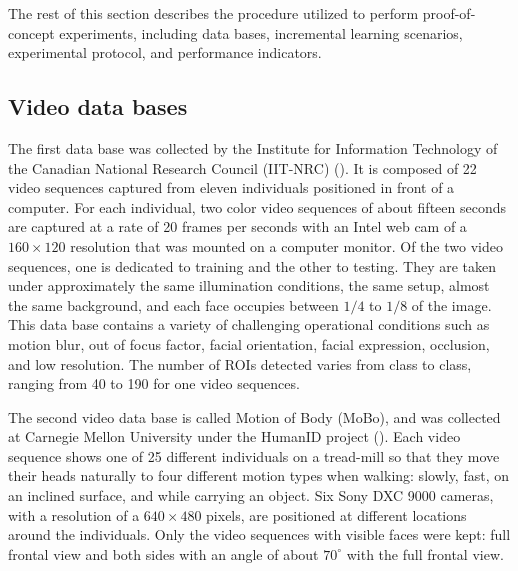 The rest of this section describes the procedure utilized to perform proof-of-concept experiments, including data bases, incremental learning scenarios, experimental protocol, and performance indicators.

\subsection{Video data bases}
\label{sec:c3_db}

The first data base was collected by the Institute for Information Technology of the Canadian National Research Council (IIT-NRC) (\cite{gorodnichy05}).
It is composed of 22 video sequences captured from eleven individuals positioned in front of a computer.
For each individual, two color video sequences of about fifteen seconds are captured at a rate of 20 frames per seconds with an Intel web cam of a $160\times120$ resolution that was mounted on a computer monitor.
Of the two video sequences, one is dedicated to training and the other to testing.
They are taken under approximately the same illumination conditions, the same setup, almost the same background, and each face occupies between $1/4$ to $1/8$ of the image.
This data base contains a variety of challenging operational conditions such as motion blur, out of focus factor, facial orientation, facial expression, occlusion, and low resolution.
The number of ROIs detected varies from class to class, ranging from 40 to 190 for one video sequences.

The second video data base is called Motion of Body (MoBo), and was collected at Carnegie Mellon University under the HumanID project (\cite{gross02}).
Each video sequence shows one of 25 different individuals on a tread-mill so that they move their heads naturally to four different motion types when walking: slowly, fast, on an inclined surface, and while carrying an object.
Six Sony DXC 9000 cameras, with a resolution of a $640\times480$ pixels, are positioned at different locations around the individuals.
Only the video sequences with visible faces were kept: full frontal view and both sides with an angle of about $70^\circ$ with the full frontal view.

